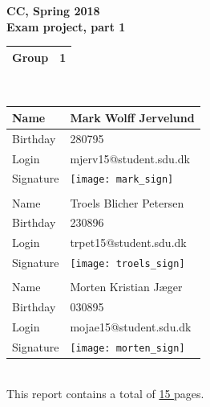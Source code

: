 \documentclass[a4paper,10pt,titlepage]{report}
\begin{document}
{%
\centering
    \huge
    \bfseries
    \vspace{5mm}
CC, Spring 2018\\
Exam project, part 1\\
\vspace{5mm}
\begin{tabular}{|l|l|}
\hline
Group & 1 \\ \hline
\end{tabular}
\\
\vspace{10mm}
\begin{tabular}{@{}ll@{}}
\toprule
\multicolumn{1}{|l|}{Name}      & \multicolumn{1}{l|}{Mark Wolff Jervelund } \\ \midrule
\multicolumn{1}{|l|}{Birthday}  & \multicolumn{1}{l|}{280795} \\ \midrule
\multicolumn{1}{|l|}{Login}     & \multicolumn{1}{l|}{mjerv15@student.sdu.dk} \\ \midrule
\multicolumn{1}{|l|}{Signature} & \multicolumn{1}{l|}{\texttt{[image: mark\_sign]}} \\ \midrule
                                &                       \\ \midrule
\multicolumn{1}{|l|}{Name}      &  \multicolumn{1}{l|}{Troels Blicher Petersen} \\ \midrule
\multicolumn{1}{|l|}{Birthday}      &   \multicolumn{1}{l|}{230896} \\ \midrule
\multicolumn{1}{|l|}{Login}      &  \multicolumn{1}{l|}{trpet15@student.sdu.dk} \\ \midrule
\multicolumn{1}{|l|}{Signature}      & \multicolumn{1}{l|}{\texttt{[image: troels\_sign]} } \\ \midrule
                                &                       \\ \midrule
\multicolumn{1}{|l|}{Name}     &  \multicolumn{1}{l|}{Morten Kristian Jæger} \\ \midrule
\multicolumn{1}{|l|}{Birthday}      &  \multicolumn{1}{l|}{030895} \\ \midrule
\multicolumn{1}{|l|}{Login}     &   \multicolumn{1}{l|}{mojae15@student.sdu.dk} \\ \midrule
\multicolumn{1}{|l|}{Signature}    &  \multicolumn{1}{l|}{\texttt{[image: morten\_sign]}} \\ \midrule
\end{tabular}
\\
\vspace{10mm}
This report contains a total of \underline{ 15 } pages.


}
\end{document}
